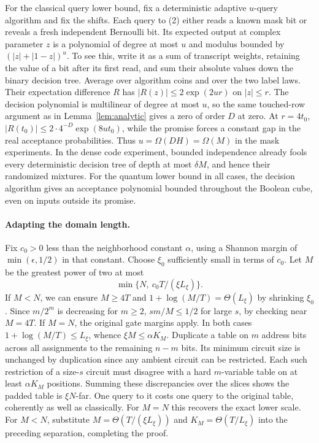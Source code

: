 For the classical query lower bound, fix a deterministic adaptive $u$-query algorithm and fix the shifts. Each query to (2) either reads a known mask bit or reveals a fresh independent Bernoulli bit. Its expected output at complex parameter $z$ is a polynomial of degree at most $u$ and modulus bounded by $(|z|+|1-z|)^u$. To see this, write it as a sum of transcript weights, retaining the value of a bit after its first read, and sum their absolute values down the binary decision tree. Average over algorithm coins and over the two label laws. Their expectation difference $R$ has $|R(z)|\le2\exp(2u r)$ on $|z|\le r$. The decision polynomial is multilinear of degree at most $u$, so the same touched-row argument as in Lemma~\ref{lem:analytic} gives a zero of order $D$ at zero. At $r=4t_0$, $|R(t_0)|\le 2\cdot4^{-D}\exp(8u t_0)$, while the promise forces a constant gap in the real acceptance probabilities. Thus $u=\Omega(DH)=\Omega(M)$ in the mask experiments. In the dense code experiment, bounded independence already fools every deterministic decision tree of depth at most $\delta M$, and hence their randomized mixtures. For the quantum lower bound in all cases, the decision algorithm gives an acceptance polynomial bounded throughout the Boolean cube, even on inputs outside its promise.

\paragraph{Adapting the domain length.}
Fix $c_0>0$ less than the neighborhood constant $\alpha$, using a Shannon margin of $\min(\epsilon,1/2)$ in that constant. Choose $\xi_0$ sufficiently small in terms of $c_0$. Let $M$ be the greatest power of two at most
\[
                 \min\{N,\ c_0 T/(\xi L_\xi)\}.
\]
If $M<N$, we can ensure $M\ge4T$ and $1+\log(M/T)=\Theta(L_\xi)$ by shrinking $\xi_0$. Since $m/2^m$ is decreasing for $m\ge2$, $s m/M\le1/2$ for large $s$, by checking near $M=4T$. If $M=N$, the original gate margins apply. In both cases $1+\log(M/T)\le L_\xi$, whence $\xi M\le\alpha K_M$. Duplicate a table on $m$ address bits across all assignments to the remaining $n-m$ bits. Its minimum circuit size is unchanged by duplication since any ambient circuit can be restricted. Each such restriction of a size-$s$ circuit must disagree with a hard $m$-variable table on at least $\alpha K_M$ positions. Summing these discrepancies over the slices shows the padded table is $\xi N$-far. One query to it costs one query to the original table, coherently as well as classically. For $M=N$ this recovers the exact lower scale. For $M<N$, substitute $M=\Theta(T/(\xi L_\xi))$ and $K_M=\Theta(T/L_\xi)$ into the preceding separation, completing the proof.

